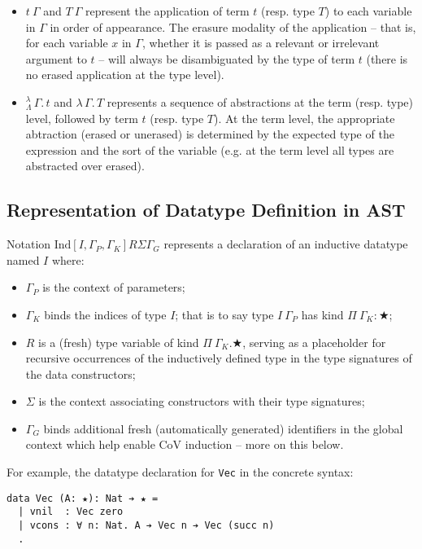 \documentclass{article}
\newcommand{\absu}[3]{{#1}\, #2.\, #3}
\newcommand{\indsche}[3]{\ensuremath{\text{Ind}[#1,#2,#3]}}
\newcommand{\lamLam}{^{\lambda}_{\Lambda}}
\begin{document}
\begin{itemize}
\item $t\ \Gamma$ and $T\ \Gamma$ represent the application of term $t$ (resp.
  type $T$) to each variable in $\Gamma$ in order of appearance. The erasure
  modality of the application -- that is, for each variable $x$ in $\Gamma$,
  whether it is passed as a relevant or irrelevant argument to $t$ -- will
  always be disambiguated by the type of term $t$ (there is no erased
  application at the type level).
\item $\absu{\lamLam}{\Gamma}{t}$ and $\absu{\lambda}{\Gamma}{T}$ represents a
  sequence of abstractions at the term (resp. type) level, followed by term $t$
  (resp. type $T$). At the term level, the appropriate abtraction (erased or
  unerased) is determined by the expected type of the expression and the sort
  of the variable (e.g. at the term level all types are abstracted over erased).
\end{itemize}

\subsection{Representation of Datatype Definition in AST}

Notation $\indsche{I}{\Gamma_P}{\Gamma_K}{R}{\Sigma}{\Gamma_G}$ represents a declaration of
an inductive datatype named $I$ where:
\begin{itemize}
\item $\Gamma_P$ is the context of parameters;
\item $\Gamma_K$ binds the indices of type $I$; that is to say type $I\ \Gamma_P$ has kind
  $Π\ \Gamma_K: ★$;
\item $R$ is a (fresh) type variable of kind $Π\ \Gamma_K. ★$, serving as a placeholder for
  recursive occurrences of the inductively defined type in the type signatures
  of the data constructors;
\item $\Sigma$ is the context associating constructors with their type
  signatures;
\item $\Gamma_G$ binds additional fresh (automatically generated) identifiers in
  the global context which help enable CoV induction -- more on this below.
\end{itemize}

For example, the datatype declaration for \texttt{Vec} in the concrete syntax:
\begin{verbatim}
data Vec (A: ★): Nat ➔ ★ =
  | vnil  : Vec zero
  | vcons : ∀ n: Nat. A ➔ Vec n ➔ Vec (succ n)
  .
\end{verbatim}
\end{document}
